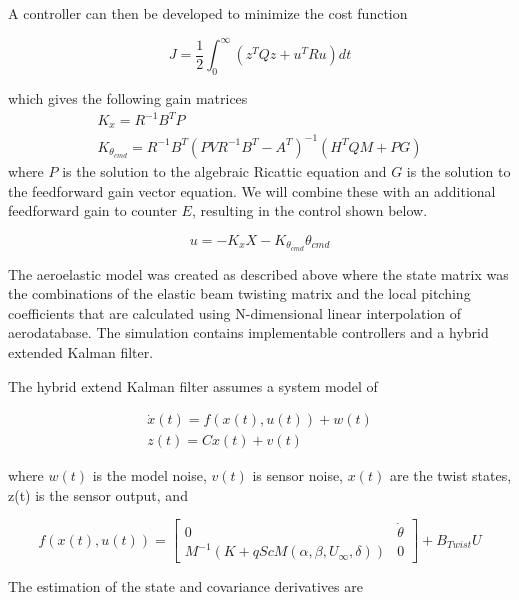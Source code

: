 \documentclass[11pt]{ucthesis}
\begin{document}
A controller can then be developed to minimize the cost function

\begin{equation}
J=\frac{1}{2}\int^{\infty}_0 (z^TQz+u^TRu)dt
\end{equation}

which gives the following gain matrices
\begin{equation}
\begin{matrix}
K_x = R^{-1}B^TP\\
K_{\theta_{cmd}} = R^{-1}B^T(PVR^{-1}B^T-A^T)^{-1}(H^TQM+PG)
\end{matrix}
\end{equation}
where $P$ is the solution to the algebraic Ricattic equation and $G$ is the solution to the feedforward gain vector equation. We will combine these with an additional feedforward gain to counter $E$, resulting in the control shown below.

\begin{equation}
u = -K_xX-K_{\theta_{cmd}}\theta_{cmd}
\end{equation}

The aeroelastic model was created as described above where the state matrix was the combinations of the elastic beam twisting matrix and the local pitching coefficients that are calculated using N-dimensional linear interpolation of aerodatabase. The simulation contains implementable controllers and a hybrid extended Kalman filter.

The hybrid extend Kalman filter assumes a system model of 

\begin{equation}
\begin{matrix}
\dot{x}(t) = f(x(t),u(t))+w(t)\\
z(t) = Cx(t)+v(t)
\end{matrix}
\end{equation}

where $w(t)$ is the model noise, $v(t)$ is sensor noise, $x(t)$ are the twist states, z(t) is the sensor output, and 

\begin{equation}
f(x(t),u(t)) = \begin{bmatrix}
0&\dot{\theta}\\
M^{-1}(K+qScM(\alpha,\beta,U_{\infty},\delta))&0\end{bmatrix}+B_{Twist}U
\end{equation}

The estimation of the state and covariance derivatives are
\end{document}
